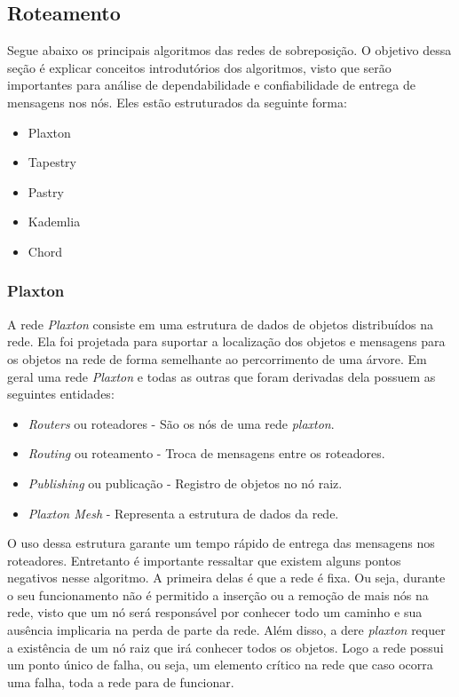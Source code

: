 \subsection{Roteamento}

Segue abaixo os principais algoritmos das redes de sobreposição. O objetivo dessa seção é explicar conceitos introdutórios dos algoritmos, visto que serão importantes para análise de dependabilidade e confiabilidade de entrega de mensagens nos nós. Eles estão estruturados da seguinte forma:
\begin{itemize}
	\item Plaxton
	\item Tapestry
	\item Pastry
	\item Kademlia
	\item Chord
\end{itemize}

\subsubsection{Plaxton}

A rede \emph{Plaxton} consiste em uma estrutura de dados de objetos distribuídos na rede. Ela foi projetada para suportar a localização dos objetos e mensagens para os objetos na rede de forma semelhante ao percorrimento de uma árvore. Em geral uma rede \emph{Plaxton} e todas as outras que foram derivadas dela possuem as seguintes entidades:
\begin{itemize}
	\item \emph{Routers} ou roteadores - São os nós de uma rede \emph{plaxton}.
	\item \emph{Routing} ou roteamento - Troca de mensagens entre os roteadores.
	\item \emph{Publishing} ou publicação - Registro de objetos no nó raiz.
	\item \emph{Plaxton Mesh} - Representa a estrutura de dados da rede.
\end{itemize}

O uso dessa estrutura garante um tempo rápido de entrega das mensagens nos roteadores. Entretanto é importante ressaltar que existem alguns pontos negativos nesse algoritmo. A primeira delas é que a rede é fixa. Ou seja, durante o seu funcionamento não é permitido a inserção ou a remoção de mais nós na rede, visto que um nó será responsável por conhecer todo um caminho e sua ausência implicaria na perda de parte da rede. Além disso, a dere \emph{plaxton} requer a existência de um nó raiz que irá conhecer todos os objetos. Logo a rede possui um ponto único de falha, ou seja, um elemento crítico na rede que caso ocorra uma falha, toda a rede para de funcionar.

